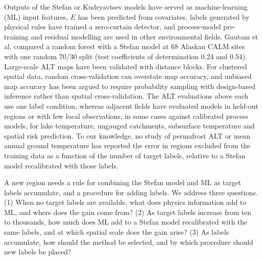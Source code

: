 Outputs of the Stefan or Kudryavtsev models have served as machine-learning (ML) input features\cite{Pilyugina2025,WangG2025}, $E$ has been predicted from covariates\cite{Ran2022b,ZhangC2024}, labels generated by physical rules have trained a zero-curtain detector\cite{Gay2026}, and process-model pre-training and residual modelling are used in other environmental fields\cite{Read2019,Jia2021,Willard2022}. Gautam et al. compared a random forest with a Stefan model at 68 Alaskan CALM sites with one random 70/30 split (test coefficients of determination 0.24 and 0.54)\cite{Gautam2025}. Large-scale ALT maps have been validated with distance blocks\cite{Aalto2018,Karjalainen2019,Ran2022a}. For clustered spatial data, random cross-validation can overstate map accuracy\cite{Roberts2017,Ploton2020,MeyerPebesma2022}, and unbiased map accuracy has been argued to require probability sampling with design-based inference rather than spatial cross-validation\cite{Wadoux2021}. The ALT evaluations above each use one label condition, whereas adjacent fields have evaluated models in held-out regions or with few local observations, in some cases against calibrated process models, for lake temperature\cite{Read2019,Jia2021,Willard2021}, ungauged catchments\cite{Pool2019,Feng2023}, subsurface temperature\cite{OMalley2026} and spatial risk prediction\cite{Portes2026}. To our knowledge, no study of permafrost ALT or mean annual ground temperature has reported the error in regions excluded from the training data as a function of the number of target labels, relative to a Stefan model recalibrated with those labels.

A new region needs a rule for combining the Stefan model and ML as target labels accumulate, and a procedure for adding labels. We address three questions. (1) When no target labels are available, what does physics information add to ML, and where does the gain come from? (2) As target labels increase from ten to thousands, how much does ML add to a Stefan model recalibrated with the same labels, and at which spatial scale does the gain arise? (3) As labels accumulate, how should the method be selected, and by which procedure should new labels be placed?

